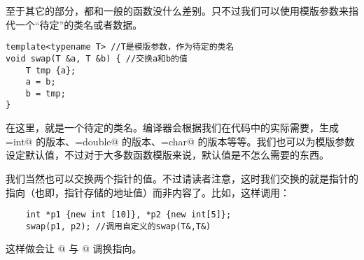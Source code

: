 至于其它的部分，都和一般的函数没什么差别。只不过我们可以使用模版参数来指代一个``待定''的类名或者数据。
\begin{lstlisting}
template<typename T> //T是模版参数，作为待定的类名
void swap(T &a, T &b) { //交换a和b的值
    T tmp {a};
    a = b;
    b = tmp;
}
\end{lstlisting}
在这里，\lstinline@T@ 就是一个待定的类名。编译器会根据我们在代码中的实际需要，生成\lstinline@T=int@ 的版本、\lstinline@T=double@ 的版本、\lstinline@T=char@ 的版本等等。我们也可以为模版参数设定默认值，不过对于大多数函数模版来说，默认值是不怎么需要的东西。\par
我们当然也可以交换两个指针的值。不过请读者注意，这时我们交换的就是指针的指向（也即，指针存储的地址值）而非内容了。比如，这样调用：
\begin{lstlisting}
    int *p1 {new int [10]}, *p2 {new int[5]};
    swap(p1, p2); //调用自定义的swap(T&,T&)
\end{lstlisting}
这样做会让 @ 与 @ 调换指向。\par
